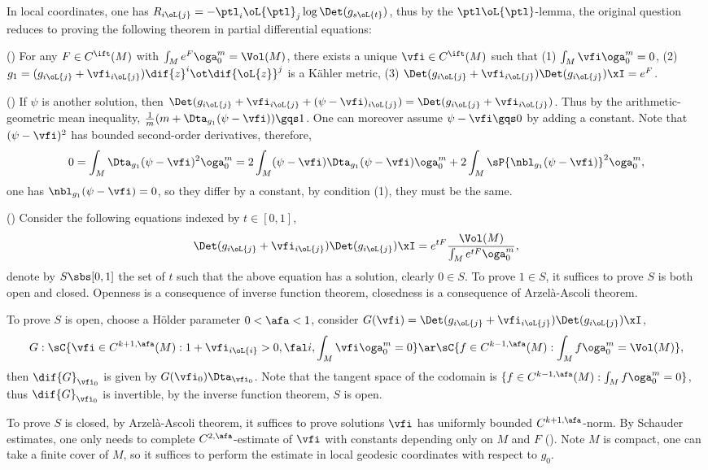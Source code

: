 \documentclass[article, a4paper, twoside]{universal}
\begin{document}
\begin{prf}
	In local coordinates, one has $R_{i\oL{j}}=-\ptl_{i}\oL{\ptl}_{j}\log\Det(g_{s\oL{t}})$, thus by the $\ptl\oL{\ptl}$-lemma, the original question reduces to proving the following theorem in partial differential equations:

	(\cite[Theorem~1]{Yau1978}) For any $F\in C^{\ift}(M)$ with $\int_{M}e^{F}\oga_{0}^{m}=\Vol(M)$, there exists a unique $\vfi\in C^{\ift}(M)$ such that (1) $\int_{M}\vfi\oga_{0}^{m}=0$, (2) $g_{1}=(g_{i\oL{j}}+\vfi_{i\oL{j}})\dif{z}^{i}\ot\dif{\oL{z}}^{j}$ is a K{\"a}hler metric, (3) $\Det(g_{i\oL{j}}+\vfi_{i\oL{j}})\Det(g_{i\oL{j}})\xI=e^{F}$.

	 (\cite[Page~375]{Yau1978}) If $\psi$ is another solution, then $\Det(g_{i\oL{j}}+\vfi_{i\oL{j}}+(\psi-\vfi)_{i\oL{j}})=\Det(g_{i\oL{j}}+\vfi_{i\oL{j}})$. Thus by the arithmetic-geometric mean inequality, $\frac{1}{m}(m+\Dta_{g_{1}}(\psi-\vfi))\gqs1$. One can moreover assume $\psi-\vfi\gqs0$ by adding a constant. Note that $(\psi-\vfi)^{2}$ has bounded second-order derivatives, therefore,
		\[
			0=\int_{M}\Dta_{g_{1}}(\psi-\vfi)^{2}\oga_{0}^{m}=2\int_{M}(\psi-\vfi)\Dta_{g_{1}}(\psi-\vfi)\oga_{0}^{m}+2\int_{M}\sP{\nbl_{g_{1}}(\psi-\vfi)}^{2}\oga_{0}^{m},
		\]
	one has $\nbl_{g_{1}}(\psi-\vfi)=0$, so they differ by a constant, by condition (1), they must be the same.



	 (\cite[Page~361]{Yau1978}) Consider the following equations indexed by $t\in[0,1]$,
	\[
		\Det(g_{i\oL{j}}+\vfi_{i\oL{j}})\Det(g_{i\oL{j}})\xI=e^{tF}\frac{\Vol(M)}{\int_{M}e^{tF}\oga_{0}^{m}},
	\]
	denote by $S\sbs[0,1]$ the set of $t$ such that the above equation has a solution, clearly $0\in S$. To prove $1\in S$, it suffices to prove $S$ is both open and closed. Openness is a consequence of inverse function theorem, closedness is a consequence of Arzel{\`a}-Ascoli theorem.
	\begin{enr}[label = (\arabic*)]
		\item To prove $S$ is open, choose a H{\"o}lder parameter $0<\afa<1$, consider $G(\vfi)=\Det(g_{i\oL{j}}+\vfi_{i\oL{j}})\Det(g_{i\oL{j}})\xI$,
		\[
			G:\sC{\vfi\in C^{k+1,\afa}(M):1+\vfi_{i\oL{i}}>0,\fal i, \int_{M}\vfi\oga_{0}^{m}=0}\ar \sC{f\in C^{k-1,\afa}(M):\int_{M}f\oga_{0}^{m}=\Vol(M)},
		\]
		then $\dif{G}_{\vfi_{0}}$ is given by $G(\vfi_{0})\Dta_{\vfi_{0}}$. Note that the tangent space of the codomain is $\{f\in C^{k-1,\afa}(M):\int_{M}f\oga_{0}^{m}=0\}$, thus $\dif{G}_{\vfi_{0}}$ is invertible, by the inverse function theorem, $S$ is open.
		\item To prove $S$ is closed, by Arzel{\`a}-Ascoli theorem, it suffices to prove solutions $\vfi$ has uniformly bounded $C^{k+1,\afa}$-norm. By Schauder estimates, one only needs to complete $C^{2,\afa}$-estimate of $\vfi$ with constants depending only on $M$ and $F$ (\cite[Proposion~2.1, Proposition~3.1]{Yau1978}). Note $M$ is compact, one can take a finite cover of $M$, so it suffices to perform the estimate in local geodesic coordinates with respect to $g_{0}$.


\end{enr}
\end{prf}
\end{document}
